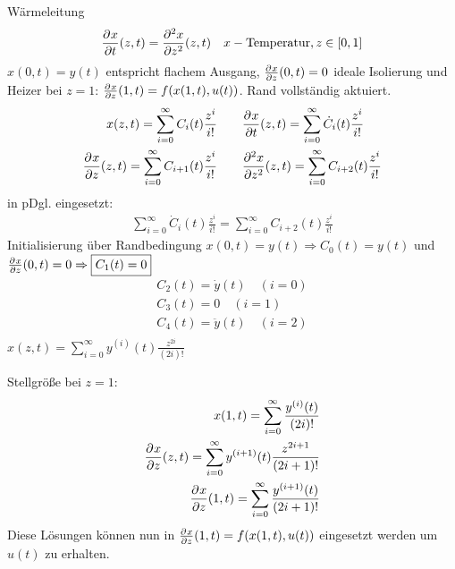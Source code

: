 \begin{bsp}{Wärmeleitung}
\begin{align*}
\pd{x}{t}(z,t)=\pd[2]{x}{z^2}(z,t) \quad x - \textrm{Temperatur}, z \in [0,1]
\end{align*}
$x(0,t)=y(t)$ entspricht flachem Ausgang, $\pd{x}{z}(0,t)=0$ ideale Isolierung und Heizer bei $z=1$: $\pd{x}{z}(1,t)=f(x(1,t),u(t))$. Rand vollständig aktuiert. \begin{align*}
x(z,t) = \sum_{i=0}^\infty C_i(t) \frac{z^i}{i!} & \qquad \pd{x}{t}(z,t) = \sum_{i=0}^\infty \dot{C}_i(t) \frac{z^i}{i!} \\
\pd{x}{z}(z,t) = \sum_{i=0}^\infty C_{i+1}(t) \frac{z^{i}}{i!} & \qquad \pd[2]{x}{z^2}(z,t) = \sum_{i=0}^\infty C_{i+2}(t) \frac{z^{i}}{i!} \\
\end{align*}
in pDgl. eingesetzt:
\begin{align*}
\sum_{i=0}^\infty \dot{C}_i(t) \frac{z^i}{i!} = \sum_{i=0}^\infty C_{i+2}(t) \frac{z^{i}}{i!}
\end{align*}
Initialisierung über Randbedingung $x(0,t)=y(t) \Rightarrow \boxed{C_0(t)=y(t)}$ und $\pd{x}{z}(0,t)=0 \Rightarrow \boxed{C_1(t)=0}$
\begin{align*}
C_2(t)=\dot{y}(t) \quad (i=0) \\
C_3(t)=0 \quad (i=1) \\
C_4(t)=\ddot{y}(t) \quad (i=2) \\
\end{align*}
$x(z,t)=\sum_{i=0}^\infty y^{(i)}(t)\frac{z^{2i}}{(2i)!}$

Stellgröße bei $z = 1$:
\begin{align*}
x(1,t)=\sum_{i=0}^\infty \frac{y^{(i)}(t)}{(2i)!} \\
\pd{x}{z}(z,t) = \sum_{i=0}^\infty y^{(i+1)}(t)\frac{z^{2i+1}}{(2i+1)!} \\
\pd{x}{z}(1,t) = \sum_{i=0}^\infty \frac{y^{(i+1)}(t)}{(2i+1)!}
\end{align*}
Diese Lösungen können nun in $\pd{x}{z}(1,t)=f(x(1,t),u(t))$ eingesetzt werden um $u(t)$ zu erhalten.
\end{bsp}



